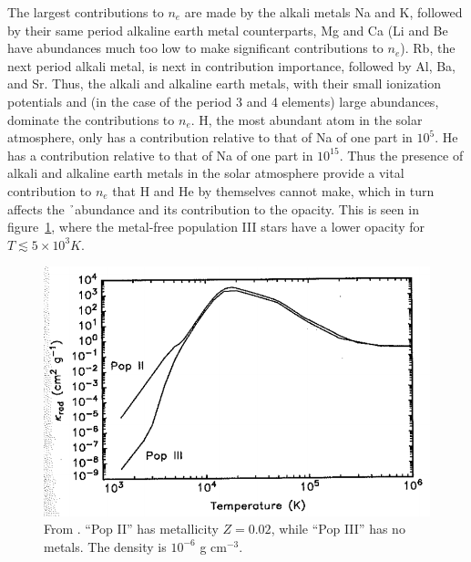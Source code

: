 The largest contributions to $n_e$ are made by the alkali metals Na
and K, followed by their same period alkaline earth metal counterparts,
Mg and Ca  (Li and Be have abundances much too low to make
significant contributions to $n_e$).  Rb, the next period alkali
metal, is next in contribution importance, followed by Al, Ba, and
Sr.  Thus, the alkali and alkaline earth metals, with their small
ionization potentials and (in the case of the period 3 and 4 elements)
large abundances, dominate the contributions to $n_e$.  H, the most
abundant atom in the solar atmosphere, only has a contribution
relative to that of Na of one part in $10^5$.  He has a contribution
relative to that of Na of one part in $10^{15}$.  Thus the presence of
alkali and alkaline earth metals in the solar atmosphere provide a
vital contribution to $n_e$ that H and He by themselves cannot make,
which in turn affects the \h\ abundance and its contribution to the
opacity.  This is seen in figure~\ref{fig:l}, where the metal-free
population III stars have a lower opacity for $T\lesssim 5\times 10
^{3} K$.
\begin{figure}
\includegraphics[width=\linewidth]{figs/opacitysee.png}
\caption{\label{fig:l}From \cite{hansen1994stellar}.  ``Pop II'' has
metallicity $Z=0.02$, while ``Pop III'' has no metals.  The density is
$10^{-6}$ g cm$^{-3}$.}
\end{figure}


